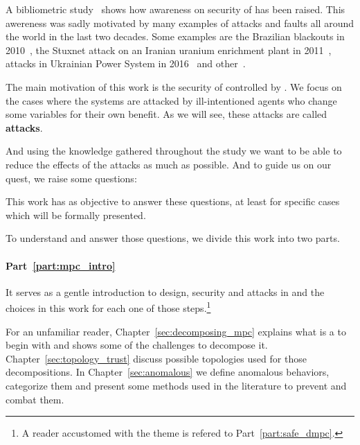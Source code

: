 \documentclass[../main.tex]{subfiles}
\begin{document}
A bibliometric study~\cite{ZacchiaEtAl2019} shows how awareness on security of \cps{} has been raised.
This awereness was sadly motivated by many examples of attacks and faults all around the world in the last two decades.
Some examples are the Brazilian blackouts in 2010~\cite{Conti2010}, the Stuxnet attack on an Iranian uranium enrichment plant in 2011~\cite{Langner2011}, attacks in Ukrainian Power System in 2016~\cite{Bindra2017} and other~\cite{DingEtAl2018,DibajiEtAl2019}.

The main motivation of this work is the security of \cps{} controlled by \dmpc{}.
We focus on the cases where the systems are attacked by ill-intentioned agents who change some variables for their own benefit.
As we will see, these attacks are called \textbf{\fdi{} attacks}.

And using the knowledge gathered throughout the study we want to be able to reduce the effects of the attacks as much as possible.
And to guide us on our quest, we raise some questions:

This work has as objective to answer these questions, at least for specific cases which will be formally presented.

To understand and answer those questions, we divide this work into two parts.

\paragraph{Part~\ref{part:mpc_intro}} It serves as a gentle introduction to \dmpc{} design, security and attacks in \cps{} and the choices in this work for each one of those steps.\footnote{A reader accustomed with the theme is refered to Part~\ref{part:safe_dmpc}.}

For an unfamiliar reader, Chapter~\ref{sec:decomposing_mpc} explains what is a \mpc{} to begin with and shows some of the challenges to decompose it.
Chapter~\ref{sec:topology_trust} discuss possible topologies used for those decompositions.
In Chapter~\ref{sec:anomalous} we define anomalous behaviors, categorize them and present some methods used in the literature to prevent and combat them.
\end{document}
